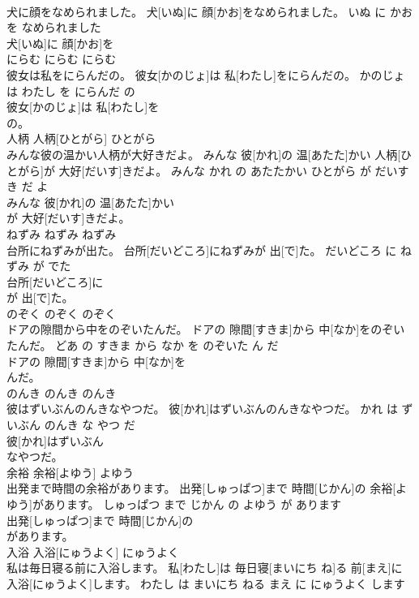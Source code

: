 \documentclass[8pt]{extreport}
\begin{document}
\begin{CJK}{UTF8}{min}
\\	犬に顔をなめられました。	犬[いぬ]に 顔[かお]をなめられました。	いぬ に かお を なめられました	
\\	犬[いぬ]に 顔[かお]を
\\	にらむ	にらむ	にらむ	
\\	彼女は私をにらんだの。	彼女[かのじょ]は 私[わたし]をにらんだの。	かのじょ は わたし を にらんだ の	
\\	彼女[かのじょ]は 私[わたし]を
\\	の。			
\\	人柄	人柄[ひとがら]	ひとがら	
\\	みんな彼の温かい人柄が大好きだよ。	みんな 彼[かれ]の 温[あたた]かい 人柄[ひとがら]が 大好[だいす]きだよ。	みんな かれ の あたたかい ひとがら が だいすき だ よ	
\\	みんな 彼[かれ]の 温[あたた]かい
\\	が 大好[だいす]きだよ。			
\\	ねずみ	ねずみ	ねずみ	
\\	台所にねずみが出た。	台所[だいどころ]にねずみが 出[で]た。	だいどころ に ねずみ が でた	
\\	台所[だいどころ]に
\\	が 出[で]た。			
\\	のぞく	のぞく	のぞく	
\\	ドアの隙間から中をのぞいたんだ。	ドアの 隙間[すきま]から 中[なか]をのぞいたんだ。	どあ の すきま から なか を のぞいた ん だ	
\\	ドアの 隙間[すきま]から 中[なか]を
\\	んだ。			
\\	のんき	のんき	のんき	
\\	彼はずいぶんのんきなやつだ。	彼[かれ]はずいぶんのんきなやつだ。	かれ は ずいぶん のんき な やつ だ	
\\	彼[かれ]はずいぶん
\\	なやつだ。			
\\	余裕	余裕[よゆう]	よゆう	
\\	出発まで時間の余裕があります。	出発[しゅっぱつ]まで 時間[じかん]の 余裕[よゆう]があります。	しゅっぱつ まで じかん の よゆう が あります	
\\	出発[しゅっぱつ]まで 時間[じかん]の
\\	があります。			
\\	入浴	入浴[にゅうよく]	にゅうよく	
\\	私は毎日寝る前に入浴します。	私[わたし]は 毎日寝[まいにち ね]る 前[まえ]に 入浴[にゅうよく]します。	わたし は まいにち ねる まえ に にゅうよく します	

\end{CJK}
\end{document}
